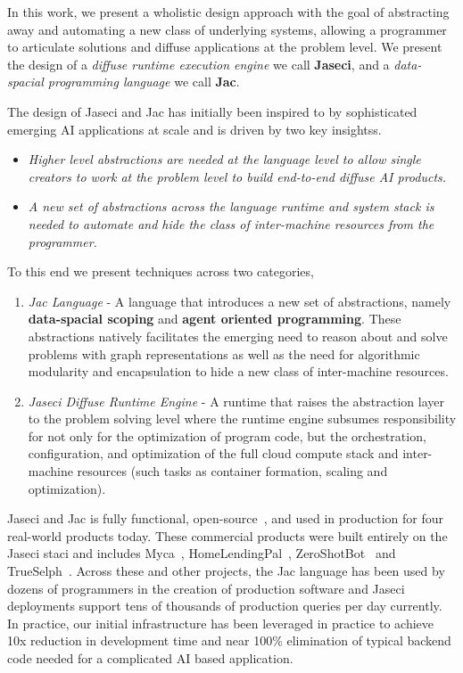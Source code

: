 In this work, we present a wholistic design approach with the goal of abstracting away and automating a new class of underlying systems, allowing a programmer to articulate solutions and diffuse applications at the problem level.
We present the design of a \emph{diffuse runtime execution engine} we call \textbf{Jaseci}, and a \emph{data-spacial programming language} we call \textbf{Jac}.

The design of Jaseci and Jac has initially been inspired to by sophisticated emerging AI applications at scale and is driven by two key insightss.

\begin{itemize}

    \item \emph{Higher level abstractions are needed at the language level to allow single creators to work at the problem level to build end-to-end diffuse AI products.}
    \item \emph{A new set of abstractions across the language runtime and system stack is needed to automate and hide the class of inter-machine resources from the programmer.}

\end{itemize}

\noindent
To this end we present techniques across two categories,

\begin{enumerate}


    \item \emph{Jac Language} - A language that introduces a new set of abstractions, namely \textbf{data-spacial scoping} and \textbf{agent oriented programming}. These abstractions natively facilitates the emerging need to reason about and solve problems with graph representations as well as the need for algorithmic modularity and encapsulation to hide a new class of inter-machine resources.
    \item \emph{Jaseci Diffuse Runtime Engine} - A runtime that raises the abstraction layer to the problem solving level where the runtime engine subsumes responsibility for not only for the optimization of program code, but the orchestration, configuration, and optimization of the full cloud compute stack and inter-machine resources (such tasks as container formation, scaling and optimization).


\end{enumerate}


Jaseci and Jac is fully functional, open-source~\cite{jaseci-website,jaseci-github,jaseci-pypi}, and used in production for four real-world products today.
These commercial products were built entirely on the Jaseci staci and includes Myca~\cite{myca-website}, HomeLendingPal~\cite{hlp-website},  ZeroShotBot~\cite{zsb-website} and TrueSelph~\cite{ts-website}.
Across these and other projects, the Jac language has been used by dozens of programmers in the creation of production software and Jaseci deployments support tens of thousands of production queries per day currently.
In practice, our initial infrastructure has been leveraged in practice to achieve 10x reduction in development time and near 100\% elimination of typical backend code needed for a complicated AI based application.

